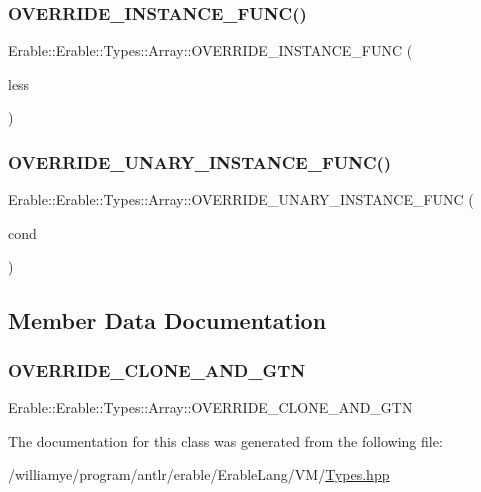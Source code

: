 \subsubsection{\texorpdfstring{OVERRIDE\_INSTANCE\_FUNC()}{OVERRIDE\_INSTANCE\_FUNC()}\hspace{0.1cm}{\footnotesize\ttfamily [4/4]}}
{\footnotesize\ttfamily Erable\+::\+Erable\+::\+Types\+::\+Array\+::\+O\+V\+E\+R\+R\+I\+D\+E\+\_\+\+I\+N\+S\+T\+A\+N\+C\+E\+\_\+\+F\+U\+NC (\begin{DoxyParamCaption}\item[{less}]{ }\end{DoxyParamCaption})}

\mbox{\label{class_erable_1_1_erable_1_1_types_1_1_array_a300cc43085ff949a3fb7f69099373487}} 
\subsubsection{\texorpdfstring{OVERRIDE\_UNARY\_INSTANCE\_FUNC()}{OVERRIDE\_UNARY\_INSTANCE\_FUNC()}}
{\footnotesize\ttfamily Erable\+::\+Erable\+::\+Types\+::\+Array\+::\+O\+V\+E\+R\+R\+I\+D\+E\+\_\+\+U\+N\+A\+R\+Y\+\_\+\+I\+N\+S\+T\+A\+N\+C\+E\+\_\+\+F\+U\+NC (\begin{DoxyParamCaption}\item[{cond}]{ }\end{DoxyParamCaption})}



\subsection{Member Data Documentation}
\mbox{\label{class_erable_1_1_erable_1_1_types_1_1_array_ac0aa982c038f07ce843551be2e6f52ac}} 
\subsubsection{\texorpdfstring{OVERRIDE\_CLONE\_AND\_GTN}{OVERRIDE\_CLONE\_AND\_GTN}}
{\footnotesize\ttfamily Erable\+::\+Erable\+::\+Types\+::\+Array\+::\+O\+V\+E\+R\+R\+I\+D\+E\+\_\+\+C\+L\+O\+N\+E\+\_\+\+A\+N\+D\+\_\+\+G\+TN}



The documentation for this class was generated from the following file\+:\begin{DoxyCompactItemize}
\item 
/williamye/program/antlr/erable/\+Erable\+Lang/\+V\+M/\mbox{\hyperlink{_types_8hpp}{Types.\+hpp}}\end{DoxyCompactItemize}
